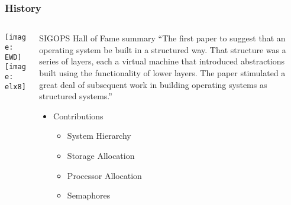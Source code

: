 \begin{frame}[plain]
	\frametitle{History}
	
	
	
	\begin{columns}
		
		\begin{column}{.4\textwidth}
			\centering
			\texttt{[image: EWD]}
			\texttt{[image: elx8]}
			
			
			
		\end{column}
		
		\begin{column}{.6\textwidth}
			
	\begin{block}{SIGOPS Hall of Fame summary}
“The first paper to suggest that an operating system be built in a structured way. That structure was a series of layers, each a virtual machine that introduced abstractions built using the functionality of lower layers. The paper stimulated a great deal of subsequent work in building operating systems as structured systems.”
\end{block} 
	\large
	\begin{itemize}
	\item Contributions
	\begin{itemize}
		\item System Hierarchy					
		\item Storage Allocation
		\item Processor Allocation
		
		\item Semaphores
		
	\end{itemize}
	
\end{itemize}	
			
		\end{column}
		
		
	\end{columns}
	
	
\end{frame}



